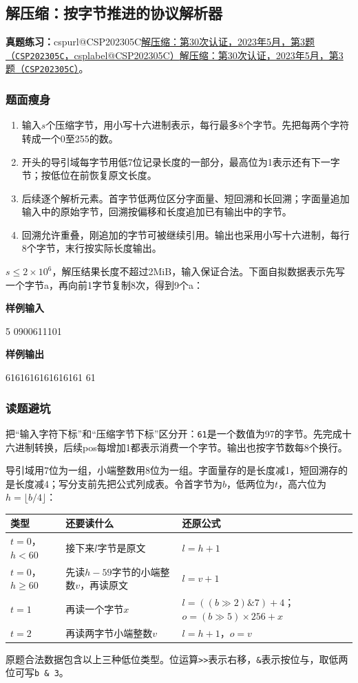 \documentclass[UTF8,11pt,a4paper,fontset=none]{ctexart}
\makeatletter
\newcommand{\csp}[2]{\ifcsname cspurl@#1\endcsname\href{\csname cspurl@#1\endcsname}{#2（\texttt{#1}，\csname csplabel@#1\endcsname）}\else\href{https://oj.shumeng.tech/p/#1}{#2（\texttt{#1}）}\fi}
\newcommand{\ojpractice}[2]{\par\noindent\textbf{真题练习：}\csp{#1}{#2}。\par}
\makeatother
\begin{document}
\subsection{解压缩：按字节推进的协议解析器}
\ojpractice{CSP202305C}{解压缩：第30次认证，2023年5月，第3题}
\subsubsection{题面瘦身}
\begin{enumerate}
\item 输入$s$个压缩字节，用小写十六进制表示，每行最多8个字节。先把每两个字符转成一个0至255的数。
\item 开头的导引域每字节用低7位记录长度的一部分，最高位为1表示还有下一字节；按低位在前恢复原文长度。
\item 后续逐个解析元素。首字节低两位区分字面量、短回溯和长回溯；字面量追加输入中的原始字节，回溯按偏移和长度追加已有输出中的字节。
\item 回溯允许重叠，刚追加的字节可被继续引用。输出也采用小写十六进制，每行8个字节，末行按实际长度输出。
\end{enumerate}
$s\le2\times10^6$，解压结果长度不超过2MiB，输入保证合法。下面自拟数据表示先写一个字节a，再向前1字节复制8次，得到9个a：
\begin{tcolorbox}[samplebox,title={输入输出样例}]
\textbf{样例输入}
\begin{Sample}
5
0900611101
\end{Sample}
\tcblower
\textbf{样例输出}
\begin{Sample}
6161616161616161
61
\end{Sample}
\end{tcolorbox}

\subsubsection{读题避坑}
把“输入字符下标”和“压缩字节下标”区分开：\texttt{61}是一个数值为97的字节。先完成十六进制转换，后续pos每增加1都表示消费一个字节。输出也按字节数每8个换行。

导引域用7位为一组，小端整数用8位为一组。字面量存的是长度减1，短回溯存的是长度减4；写分支前先把公式列成表。令首字节为$b$，低两位为$t$，高六位为$h=\lfloor b/4\rfloor$：
\begin{longtable}{P{2.3cm}P{5.9cm}P{5.8cm}}
\toprule 类型 & 还要读什么 & 还原公式\\\midrule\endhead
$t=0$，$h<60$ & 接下来$l$字节是原文 & $l=h+1$\\
$t=0$，$h\ge60$ & 先读$h-59$字节的小端整数$v$，再读原文 & $l=v+1$\\
$t=1$ & 再读一个字节$x$ & $l=((b\mathbin{\gg}2)\mathbin{\&}7)+4$；$o=(b\mathbin{\gg}5)\times256+x$\\
$t=2$ & 再读两字节小端整数$v$ & $l=h+1$，$o=v$\\
\bottomrule\end{longtable}
原题合法数据包含以上三种低位类型。位运算\texttt{>>}表示右移，\texttt{\&}表示按位与，取低两位可写\texttt{b \& 3}。
\end{document}
